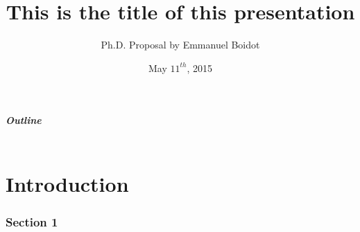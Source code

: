\documentclass[10pt,compress]{beamer}
\title[Short title] %
{This is the title of this presentation}
\author[E. Boidot]%
{Ph.D. Proposal by Emmanuel Boidot}
\institute %
{Advisor: Dr. Eric Feron \\ Georgia Institute of Technology\\
  Guggenheim School of Aerospace Engineering}
\date{May $11^{th}$, 2015} %
\begin{document}
{ %
\setlength{\headheight}{0in}

\begin{frame}
\titlepage
\end{frame}
}
\addtocounter{framenumber}{-1}

{
\begin{frame}\frametitle{Outline}
  \begin{columns}
  	\begin{column}{.7\textwidth}
  		\begin{tocblock}{}
  		\vspace*{1em}\tableofcontents[onlyparts]
  		\end{tocblock}		
  	\end{column}
  \end{columns}
\end{frame} 
}


\part[Intro]{Introduction} 

\section{Section 1}
\end{document}
